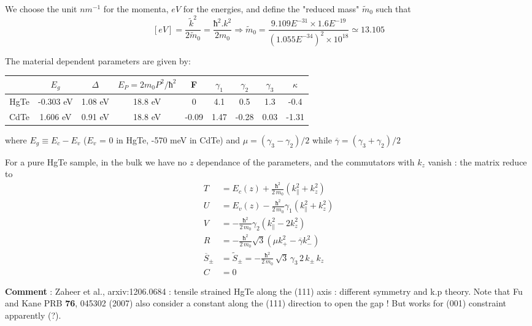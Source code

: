 \documentclass[prb,aps]{revtex4}
\begin{document}
		We choose the unit $nm^{-1}$ for the momenta, $eV$ for the energies, and define the "reduced mass"  $\tilde{m}_0$ such that 
		$$
		[eV] = 
		\frac{\tilde{k}^2}{2\tilde{m}_0}  = 
		\frac{ħ^2 . k^2 }{2 m_0} 
		\Rightarrow 
		\tilde{m}_0 = \frac{9.109E^{-31} \times 1.6E^{-19}}{(1.055E^{-34})^2 \times 10^{18}} \simeq 13.105
		$$
		
		 The material dependent parameters are given by:
		 \begin{center}
		 \begin{tabular}{| c | c | c | c  | c  | c  | c  | c  | c |}
		     \hline
			 & $E_g$ & $Δ$ & $E_P = 2 m_0 P^2 / ħ^2$ & F & $γ_1$ & $γ_2$ & $γ_3$ & $κ$ \\
			 \hline 
			 HgTe & -0.303 eV & 1.08 eV & 18.8 eV  & 0 & 4.1 & 0.5 & 1.3 & -0.4 \\
			 CdTe & 1.606 eV & 0.91 eV & 18.8 eV  & -0.09 & 1.47 & -0.28 & 0.03 & -1.31\\
			 \hline
		 \end{tabular}
		 \end{center}
		 
		where $E_{g} \equiv E_{c} - E_{v}$ ($E_v$ = 0 in HgTe, -570 meV in CdTe)
		and $μ=(γ_3 - γ_2)/2$ while $\overline{γ}=(γ_3 + γ_2)/2$
		 
		
		For a pure HgTe sample, in the bulk we have no $z$ dependance of the parameters, and the commutators with $k_z$ vanish : the matrix reduce to 
		\begin{align}
			 T &= E_c(z) + \frac{ħ^2}{2\,m_0} \left(  k_\parallel^2 + k_z^2 \right)  \\
			 U &= E_v(z) - \frac{ħ^2 }{2\,m_0}γ_1  \left(  k_\parallel^2 + k_z^2  \right) \\
			 V &=  - \frac{ħ^2 }{2\,m_0} γ_2 \left(  k_\parallel^2 -2 k_z^2  \right) \\
			R &= - \frac{ħ^2 }{2\,m_0} \sqrt{3} \left( μ k_+^2 - \overline{γ} k_-^2 \right) \\
			\overline{S}_\pm &= \tilde{S}_\pm = 
			- \frac{ħ^2 }{2\,m_0}\,\sqrt{3}\,γ_3\,2\,k_\pm\,k_z  \\
			C &= 0 
		\end{align}
		
		
		{\bf Comment} : Zaheer et al., arxiv:1206.0684 : tensile strained HgTe along the (111) axis : different symmetry and k.p theory. 
		Note that Fu and Kane PRB {\bf 76}, 045302 (2007) also consider a constant along the (111) direction to open the gap ! But works 
		for (001) constraint apparently (?). 
\end{document}
